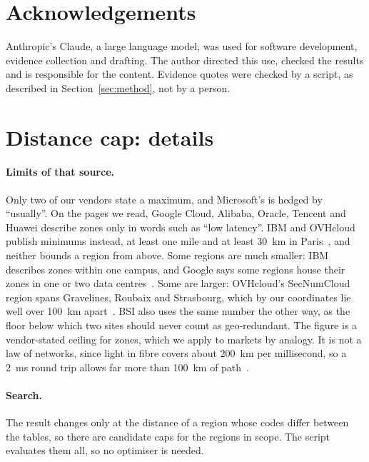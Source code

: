 \documentclass[10pt,twocolumn]{article}
\begin{document}
\section*{Acknowledgements}
Anthropic's Claude, a large language model, was used for software development, evidence collection and drafting. The author directed this use, checked the results and is responsible for the content. Evidence quotes were checked by a script, as described in Section~\ref{sec:method}, not by a person.

\onecolumn



\clearpage
\appendix
\section{Distance cap: details}
\label{app:cap}

\paragraph{Limits of that source.} Only two of our \providerCount{} vendors state a maximum, and Microsoft's is hedged by ``usually''. On the pages we read, Google Cloud, Alibaba, Oracle, Tencent and Huawei describe zones only in words such as ``low latency''. IBM and OVHcloud publish minimums instead, at least one mile and at least 30~km in Paris~\citep{ibm_locations,ovh_3az}, and neither bounds a region from above. Some regions are much smaller: IBM describes zones within one campus, and Google says some regions house their zones in one or two data centres~\citep{google_geography}. Some are larger: OVHcloud's SecNumCloud region spans Gravelines, Roubaix and Strasbourg, which by our coordinates lie well over 100~km apart~\citep{ovh_regions}. BSI also uses the same number the other way, as the floor below which two sites should never count as geo-redundant. The figure is a vendor-stated ceiling for zones, which we apply to markets by analogy. It is not a law of networks, since light in fibre covers about 200~km per millisecond, so a 2~ms round trip allows far more than 100~km of path~\citep{singla2014internet}.

\paragraph{Search.} The result changes only at the distance of a region whose codes differ between the tables, so there are \capCount{} candidate caps for the \capRegions{} regions in scope. The script evaluates them all, so no optimiser is needed.
\end{document}
